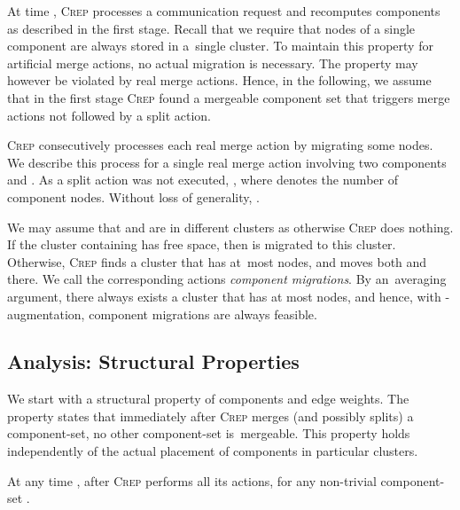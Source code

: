 \documentclass{siamart190516}
\newcommand{\CREP}{\textsc{Crep}\xspace}
\begin{document}
At time , \CREP processes a communication request and recomputes components
as described in the first stage. Recall that we require that nodes of a single
component are always stored in a~single cluster. To maintain this property for
artificial merge actions, no actual migration is necessary. The property may
however be violated by real merge actions. Hence, in the following, we assume
that in the first stage \CREP found a mergeable component set  that triggers  merge actions not 
followed by a split action.

\CREP consecutively processes each real merge action by migrating some nodes.
We describe this process for a single real merge action involving two
components  and . As a split action was not executed, , where  denotes the number of component  nodes.
Without loss of generality, .

We may assume that  and  are in different clusters as otherwise
\CREP does nothing. If the cluster containing  has  free space,
then  is migrated to this cluster. Otherwise, \CREP finds a cluster that
has at~most  nodes, and moves both  and  there. We call the
corresponding actions \emph{component migrations}. By an~averaging argument,
there always exists a cluster that has at most  nodes, and hence, with
-augmentation, component migrations are always feasible.


\subsection{Analysis: Structural Properties}

We start with a structural property of components and edge weights.
The property states that immediately after \CREP merges (and
possibly splits) a component-set, no other component-set is~mergeable. This
property holds independently of the actual placement of components in
particular clusters.

\begin{lemma}
\label{lem:wS_bound}
At any time , after \CREP performs all its actions,
 for any non-trivial component-set .
\end{lemma}
\end{document}
